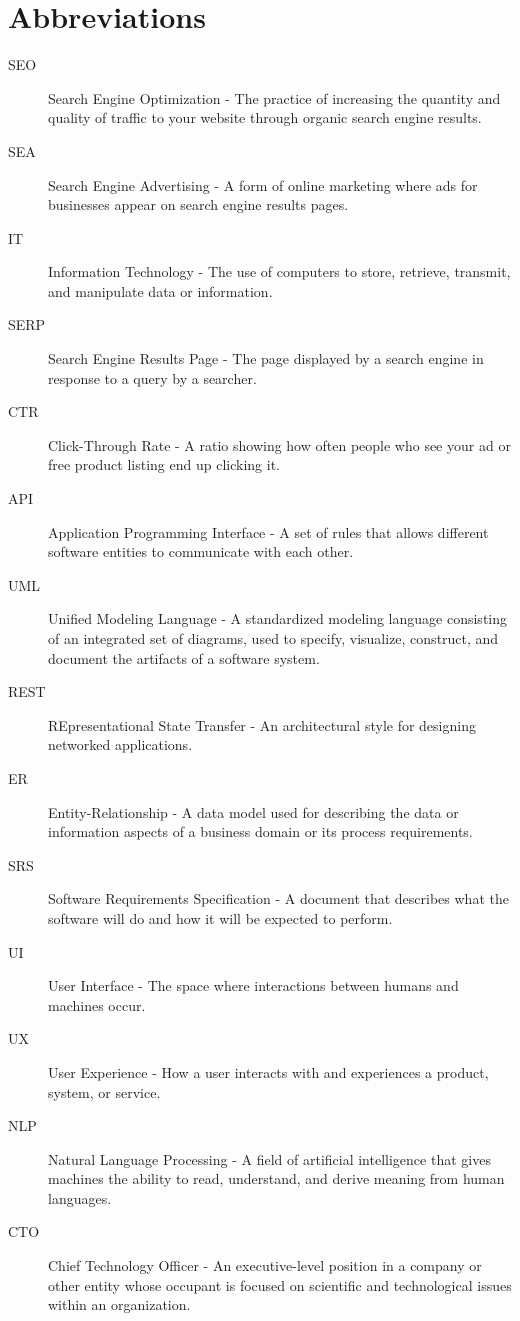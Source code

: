 \documentclass[12pt,a4paper]{article}
\begin{document}
\section*{Abbreviations}
\begin{description}
    \item[SEO] Search Engine Optimization - The practice of increasing the quantity and quality of traffic to your website through organic search engine results.
    \item[SEA] Search Engine Advertising - A form of online marketing where ads for businesses appear on search engine results pages.
    \item[IT] Information Technology - The use of computers to store, retrieve, transmit, and manipulate data or information.
    \item[SERP] Search Engine Results Page - The page displayed by a search engine in response to a query by a searcher.
    \item[CTR] Click-Through Rate - A ratio showing how often people who see your ad or free product listing end up clicking it.
    \item[API] Application Programming Interface - A set of rules that allows different software entities to communicate with each other.
    \item[UML] Unified Modeling Language - A standardized modeling language consisting of an integrated set of diagrams, used to specify, visualize, construct, and document the artifacts of a software system.
    \item[REST] REpresentational State Transfer - An architectural style for designing networked applications.
    \item[ER] Entity-Relationship - A data model used for describing the data or information aspects of a business domain or its process requirements.
    \item[SRS] Software Requirements Specification - A document that describes what the software will do and how it will be expected to perform.
    \item[UI] User Interface - The space where interactions between humans and machines occur.
    \item[UX] User Experience - How a user interacts with and experiences a product, system, or service.
    \item[NLP] Natural Language Processing - A field of artificial intelligence that gives machines the ability to read, understand, and derive meaning from human languages.
    \item[CTO] Chief Technology Officer - An executive-level position in a company or other entity whose occupant is focused on scientific and technological issues within an organization.
\end{description}
\end{document}
